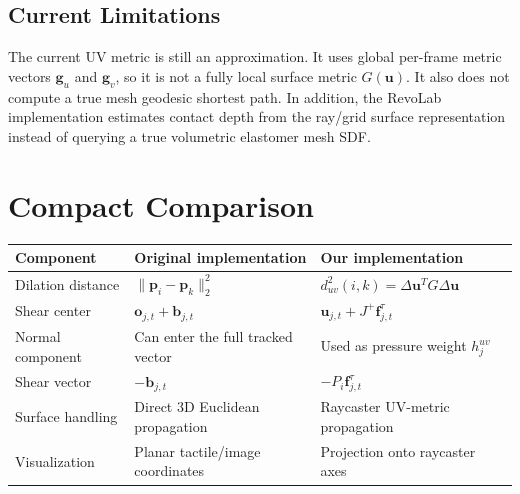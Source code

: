 \documentclass[11pt]{article}
\begin{document}
\subsection{Current Limitations}

The current UV metric is still an approximation. It uses global per-frame
metric vectors $\mathbf{g}_u$ and $\mathbf{g}_v$, so it is not a fully local
surface metric $G(\mathbf{u})$. It also does not compute a true mesh geodesic
shortest path. In addition, the RevoLab implementation estimates contact depth
from the ray/grid surface representation instead of querying a true volumetric
elastomer mesh SDF.

\section{Compact Comparison}

\begin{center}
\begin{tabular}{lll}
\toprule
Component & Original implementation & Our implementation \\
\midrule
Dilation distance
&
$\|\mathbf{p}_i-\mathbf{p}_k\|_2^2$
&
$d^2_{uv}(i,k)=\Delta\mathbf{u}^T G\Delta\mathbf{u}$ \\
Shear center
&
$\mathbf{o}_{j,t}+\mathbf{b}_{j,t}$
&
$\mathbf{u}_{j,t}+J^+\mathbf{f}^{\tau}_{j,t}$ \\
Normal component
&
Can enter the full tracked vector
&
Used as pressure weight $h^{uv}_j$ \\
Shear vector
&
$-\mathbf{b}_{j,t}$
&
$-P_i\mathbf{f}^{\tau}_{j,t}$ \\
Surface handling
&
Direct 3D Euclidean propagation
&
Raycaster UV-metric propagation \\
Visualization
&
Planar tactile/image coordinates
&
Projection onto raycaster axes \\
\bottomrule
\end{tabular}
\end{center}
\end{document}
